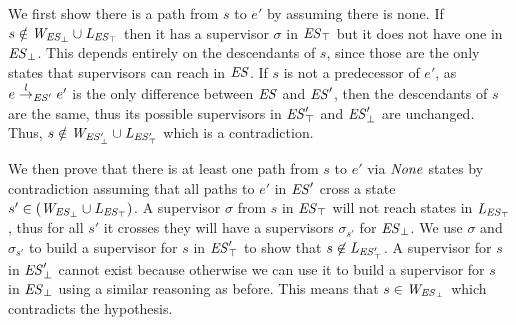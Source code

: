 We first show there is a path from $s$ to $e'$ by assuming there is none. If $s \notin 
\mathit{W_{\mathit{\mathit{ES}_{\bot}}}} \cup \mathit{L_{\mathit{\mathit{ES}_{\top}}}}$ then it has a supervisor $\sigma$ in 
$\mathit{\mathit{ES}_{\top}}$ but it does not have one in 
$\mathit{\mathit{ES}_{\bot}}$. This depends entirely on the descendants of 
$s$, since those are the only states that supervisors can reach in $\mathit{ES}$. If $s$ 
is not a predecessor of $e'$, as $e \overset{l}{\rightarrow}_{\mathit{ES}'} e'$ is the only difference 
between $\mathit{ES}$ and $\mathit{ES}'$, then the descendants of $s$ are the same, 
thus its possible supervisors in $\mathit{\mathit{ES}'_{\top}}$ and 
$\mathit{\mathit{ES}'_{\bot}}$ are unchanged. Thus, $s \notin \mathit{W_{\mathit{\mathit{ES}'_{\bot}}}} \cup 
\mathit{L_{\mathit{\mathit{ES}'_{\top}}}}$ which is a contradiction.

We then prove that there is at least one path from $s$ to $e'$ via $\mathit{None}$ states by 
contradiction assuming that all paths to $e'$ in $\mathit{ES}'$ cross a state $s' \in 
(\mathit{W_{\mathit{\mathit{ES}_{\bot}}}} \cup \mathit{L_{\mathit{\mathit{ES}_{\top}}}})$. A supervisor $\sigma$ from $s$ in 
$\mathit{\mathit{ES}_{\top}}$ will not reach states in $\mathit{L_{\mathit{\mathit{ES}_{\top}}}}$, 
thus for all $s'$ it crosses they will have a supervisors $\sigma_{s'}$ for 
$\mathit{\mathit{ES}_{\bot}}$. We use $\sigma$ and $\sigma_{s'}$  to 
build a supervisor for $s$ in $\mathit{\mathit{ES}'_{\top}}$ to show that $s 
\not\in \mathit{L_{\mathit{\mathit{ES}'_{\top}}}}$.
A supervisor for $s$ in $\mathit{\mathit{ES}'_{\bot}}$ cannot exist because 
otherwise we can use it to build a supervisor for $s$ in 
$\mathit{\mathit{ES}_{\bot}}$ using a similar reasoning as before. This means 
that $s \in 
\mathit{W_{\mathit{\mathit{ES}_{\bot}}}}$ which contradicts the hypothesis. 






%
%
%
%

